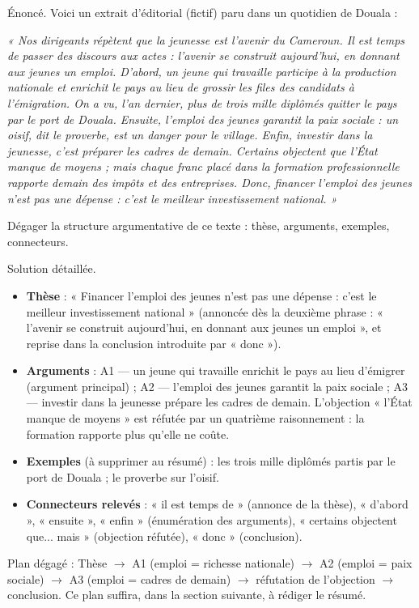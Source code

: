 \documentclass[11pt]{article}
\begin{document}
\begin{exoresolu}
Énoncé. Voici un extrait d'éditorial (fictif) paru dans un quotidien de Douala :

\emph{« Nos dirigeants répètent que la jeunesse est l'avenir du Cameroun. Il est temps de passer des discours aux actes : l'avenir se construit aujourd'hui, en donnant aux jeunes un emploi. D'abord, un jeune qui travaille participe à la production nationale et enrichit le pays au lieu de grossir les files des candidats à l'émigration. On a vu, l'an dernier, plus de trois mille diplômés quitter le pays par le port de Douala. Ensuite, l'emploi des jeunes garantit la paix sociale : un oisif, dit le proverbe, est un danger pour le village. Enfin, investir dans la jeunesse, c'est préparer les cadres de demain. Certains objectent que l'État manque de moyens ; mais chaque franc placé dans la formation professionnelle rapporte demain des impôts et des entreprises. Donc, financer l'emploi des jeunes n'est pas une dépense : c'est le meilleur investissement national. »}

Dégager la structure argumentative de ce texte : thèse, arguments, exemples, connecteurs.

\tcblower
Solution détaillée.
\begin{itemize}
\item \textbf{Thèse} : « Financer l'emploi des jeunes n'est pas une dépense : c'est le meilleur investissement national » (annoncée dès la deuxième phrase : « l'avenir se construit aujourd'hui, en donnant aux jeunes un emploi », et reprise dans la conclusion introduite par « donc »).
\item \textbf{Arguments} : A1 — un jeune qui travaille enrichit le pays au lieu d'émigrer (argument principal) ; A2 — l'emploi des jeunes garantit la paix sociale ; A3 — investir dans la jeunesse prépare les cadres de demain. L'objection « l'État manque de moyens » est réfutée par un quatrième raisonnement : la formation rapporte plus qu'elle ne coûte.
\item \textbf{Exemples} (à supprimer au résumé) : les trois mille diplômés partis par le port de Douala ; le proverbe sur l'oisif.
\item \textbf{Connecteurs relevés} : « il est temps de » (annonce de la thèse), « d'abord », « ensuite », « enfin » (énumération des arguments), « certains objectent que... mais » (objection réfutée), « donc » (conclusion).
\end{itemize}
Plan dégagé : Thèse $\rightarrow$ A1 (emploi = richesse nationale) $\rightarrow$ A2 (emploi = paix sociale) $\rightarrow$ A3 (emploi = cadres de demain) $\rightarrow$ réfutation de l'objection $\rightarrow$ conclusion. Ce plan suffira, dans la section suivante, à rédiger le résumé.
\end{exoresolu}
\end{document}
